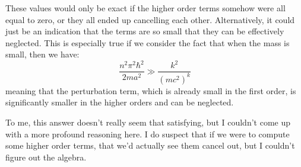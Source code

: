 \documentclass[10pt]{article}
\begin{document}
\begin{enumerate}[label=(\alph*)]
        \begin{solution}
            These values would only be exact if the higher order terms somehow were all equal to zero, or they all ended up cancelling each other. Alternatively, it could just be an indication that the terms are so small that they can be effectively neglected. This is especially true if we consider the fact that when the mass is small, then we have:
            \[ \frac{n^2 \pi^2 \hbar^2}{2ma^2} \gg \frac{k^2}{(mc^2)^k}\]
            meaning that the perturbation term, which is already small in the first order, is significantly smaller in the higher orders and can be neglected. 

            To me, this answer doesn't really seem that satisfying, but I couldn't come up with a more profound reasoning here. I do suspect that if we were to compute some higher order terms, that we'd actually see them cancel out, but I couldn't figure out the algebra.
        \end{solution}
    \end{enumerate}

    \pagebreak
\end{document}
